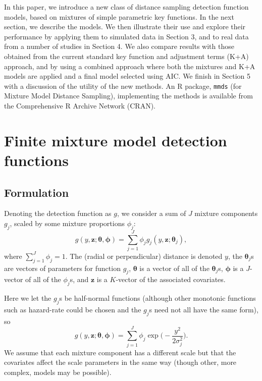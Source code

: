 \documentclass[useAMS,referee,usenatbib]{biom}
\begin{document}
In this paper, we introduce a new class of distance sampling detection function models, based on mixtures of simple parametric key functions.  In the next section, we describe the models.  We then illustrate their use and explore their performance by applying them to simulated data in Section 3, and to real data from a number of studies in Section 4. We also compare results with those obtained from the current standard key function and adjustment terms (K+A) approach, and by using a combined approach where both the mixtures and K+A models are applied and a final model selected using AIC.  We finish in Section 5 with a discussion of the utility of the new methods.  An R \citep{Team:2013wf} package, \texttt{mmds} (for Mixture Model Distance Sampling), implementing the methods is available from the Comprehensive R Archive Network (CRAN).

\section{Finite mixture model detection functions}

\subsection{Formulation}
\label{s:detfcts}

Denoting the detection function as $g$, we consider a sum of $J$ mixture components $g_j$, scaled by some mixture proportions $\phi_j$:
\begin{equation*}
g(y,\mathbf{z}; \bm{\theta}, \bm{\phi}) = \sum_{j=1}^J \phi_j g_j(y,\mathbf{z}; \bm{\theta}_j),
\end{equation*}
where $\sum_{j=1}^J \phi_j = 1$. The (radial or perpendicular) distance is denoted $y$, the $\bm{\theta}_j$s are vectors of parameters for function $g_j$, $\bm{\theta}$ is a vector of all of the $\bm{\theta}_j$s, $\bm{\phi}$ is a $J$-vector of all of the $\phi_j$s, and $\mathbf{z}$ is a $K$-vector of the associated covariates.  

Here we let the $g_j$s be half-normal functions (although other monotonic functions such as hazard-rate could be chosen and the $g_j$s need not all have the same form), so
\begin{equation*}
g(y,\mathbf{z}; \bm{\theta}, \bm{\phi}) = \sum_{j=1}^J \phi_j \exp \Big( - \frac{y^2}{2\sigma_j^2} \Big).
\end{equation*}
We assume that each mixture component has a different scale but that the covariates affect the scale parameters in the same way (though other, more complex, models may be possible).
\end{document}
